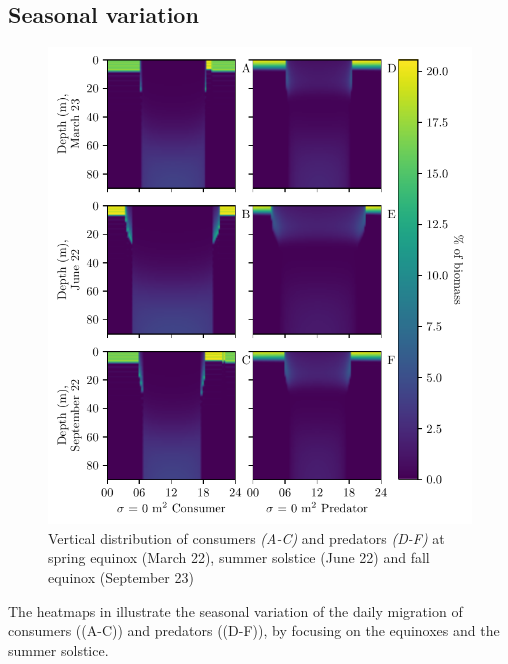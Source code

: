 
\subsection{Seasonal variation}
\begin{figure}[H]
\includegraphics{plots/total_heatmap.pdf}
\caption{Vertical distribution of consumers \emph{(A-C)} and predators \emph{(D-F)} at spring equinox (March 22), summer solstice (June 22) and fall equinox (September 23)}
\label{fig:heatmap_total}
\end{figure}
The heatmaps in  illustrate the seasonal variation of the daily migration of consumers ((A-C)) and predators ((D-F)), by focusing on the equinoxes and the summer solstice.
